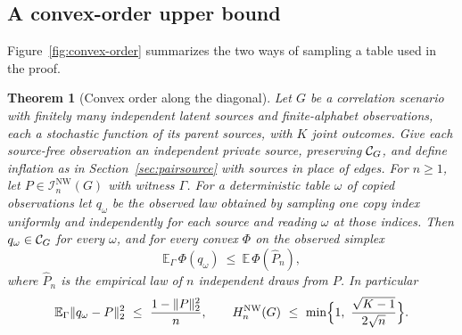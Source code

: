 \documentclass[11pt]{article}
\theoremstyle{plain}
\newtheorem{theorem}{Theorem}[section]
\theoremstyle{definition}
\newcommand{\INW}{\mathcal I^{\mathrm{NW}}}
\newcommand{\E}{\mathbb E}
\begin{document}
\subsection{A convex-order upper bound}\label{sec:convexorder}

Figure~\ref{fig:convex-order} summarizes the two ways of sampling a table used in the proof.

\begin{theorem}[Convex order along the diagonal]\label{thm:convexorder}
Let $G$ be a correlation scenario with finitely many independent latent sources and finite-alphabet observations, each a stochastic function of its parent sources, with $K$ joint outcomes. Give each source-free observation an independent private source, preserving $\mathcal C_{G}$, and define inflation as in Section~\ref{sec:pairsource} with sources in place of edges. For $n\ge1$, let $P\in\INW_n(G)$ with witness $\Gamma$. For a deterministic table $\omega$ of copied observations let $q_\omega$ be the observed law obtained by sampling one copy index uniformly and independently for each source and reading $\omega$ at those indices. Then $q_\omega\in\mathcal C_{G}$ for every $\omega$, and for every convex $\Phi$ on the observed simplex
\begin{equation}\label{eq:convexorder}
\E_\Gamma\,\Phi(q_\omega)\ \le\ \E\,\Phi(\widehat P_n),
\end{equation}
where $\widehat P_n$ is the empirical law of $n$ independent draws from $P$. In particular
\begin{equation}\label{eq:convexl2}
\E_\Gamma\|q_\omega-P\|_2^2\ \le\ \frac{1-\|P\|_2^2}{n},
\qquad
H^{\mathrm{NW}}_n(G)\ \le\ \min\Bigl\{1,\ \frac{\sqrt{K-1}}{2\sqrt n}\Bigr\}.
\end{equation}
\end{theorem}
\end{document}
